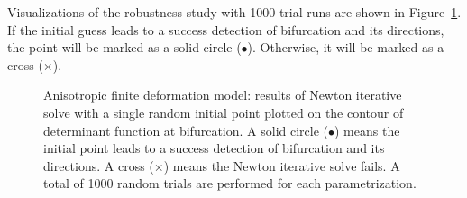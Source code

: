 \documentclass[12pt]{article}
\numberwithin{equation}{section}
\begin{document}
Visualizations of the robustness study with 1000 trial runs are shown 
in Figure~\ref{fig:aniso_uniaxial_robust}. If the initial guess leads 
to a success detection of bifurcation and its directions, the point 
will be marked as a solid circle ($\bullet$). Otherwise, it will be 
marked as a cross ($\times$).

\begin{figure}[H]
   \centering {}   
   \caption{Anisotropic finite deformation model: results of Newton 
   iterative solve with a single random initial point plotted on the 
   contour of determinant function at bifurcation. A solid circle 
   ($\bullet$) means the initial point leads to a success detection of 
   bifurcation and its directions. A cross ($\times$) means the Newton 
   iterative solve fails. A total of 1000 random trials are performed 
   for each parametrization.}
   \label{fig:aniso_uniaxial_robust}
 \end{figure}
\end{document}

